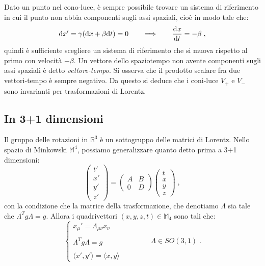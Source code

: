 Dato un punto nel cono-luce, è sempre possibile trovare un sistema di riferimento in cui il punto non abbia componenti sugli assi 
spaziali, cioè in modo tale che:
\begin{equation}
\mathrm{d}{x'}=\gamma(\mathrm{d}{x}+\beta\mathrm{d}{t})=0\qquad \Longrightarrow\qquad \frac{\mathrm{d}^{}x}{\mathrm{d}t^{}}=-\beta\;,
\end{equation}
quindi è sufficiente scegliere un sistema di riferimento che si muova rispetto al primo con velocità $-\beta$. Un vettore dello 
spaziotempo non avente componenti sugli assi spaziali è detto \textit{vettore-tempo}. Si osserva che il prodotto scalare fra due 
vettori-tempo è sempre negativo. Da questo si deduce che i coni-luce $V_+$ e $V_-$ sono invarianti per trasformazioni di Lorentz.
\subsection{In 3+1 dimensioni}
Il gruppo delle rotazioni in $\mathbb{R}^3$ è un sottogruppo delle matrici di Lorentz. Nello spazio di Minkowski $\mathbb{M}^4$, 
possiamo generalizzare quanto detto prima a 3+1 dimensioni:
\begin{equation}
\begin{pmatrix}
t' \\
x' \\
y' \\
z'
\end{pmatrix}=\begin{pmatrix}
A & B \\
0 & D
\end{pmatrix}\begin{pmatrix}
t \\
x \\
y \\
z
\end{pmatrix}\;,
\end{equation}
con la condizione che la matrice della trasformazione, che denotiamo $\Lambda$ sia tale che $\Lambda^T g\Lambda=g$. Allora i 
quadrivettori $(x,y,z,t)\in \mathbb{M}_4$ sono tali che:
\begin{equation}
\begin{cases}
x_{\mu}'=\Lambda_{\mu\nu}x_{\nu} \\
\\
\Lambda^Tg\Lambda= g \\
\\
\langle x', y'\rangle = \langle x, y\rangle
\end{cases}\qquad\qquad \Lambda\in SO(3,1)\;.
\end{equation}
